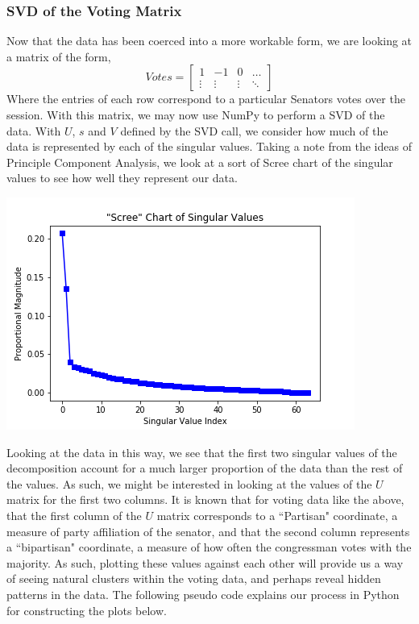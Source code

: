 \documentclass[letterpaper,12pt]{article}
\begin{document}
\subsubsection{SVD of the Voting Matrix}
Now that the data has been coerced into a more workable form, we are looking at a matrix of the form,
\[Votes=\begin{bmatrix}
1 & -1 & 0 & \ldots\\
\vdots & \vdots & \vdots & \ddots
\end{bmatrix} \]
Where the entries of each row correspond to a particular Senators votes over the session. With this matrix, we may now use NumPy to perform a SVD of the data. With $U$, $s$ and $V$ defined by the SVD call, we consider how much of the data is represented by each of the singular values. Taking a note from the ideas of Principle Component Analysis, we look at a sort of Scree chart of the singular values to see how well they represent our data.
\begin{center}
\includegraphics[scale=.75]{votescree.png}
\end{center}
Looking at the data in this way, we see that the first two singular values of the decomposition account for a much larger proportion of the data than the rest of the values. As such, we might be interested in looking at the values of the $U$ matrix for the first two columns. It is known that for voting data like the above, that the first column of the $U$ matrix corresponds to a ``Partisan" coordinate, a measure of party affiliation of the senator, and that the second column represents a ``bipartisan" coordinate, a measure of how often the congressman votes with the majority. As such, plotting these values against each other will provide us a way of seeing natural clusters within the voting data, and perhaps reveal hidden patterns in the data. The following pseudo code explains our process in Python for constructing the plots below.
\end{document}

